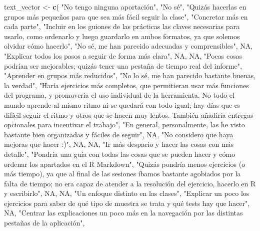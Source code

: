 \documentclass[
]{article}
\newenvironment{Shaded}{\begin{snugshade}}{\end{snugshade}}
\newcommand{\ConstantTok}[1]{\textcolor[rgb]{0.56,0.35,0.01}{#1}}
\newcommand{\FunctionTok}[1]{\textcolor[rgb]{0.13,0.29,0.53}{\textbf{#1}}}
\newcommand{\NormalTok}[1]{#1}
\newcommand{\OtherTok}[1]{\textcolor[rgb]{0.56,0.35,0.01}{#1}}
\newcommand{\StringTok}[1]{\textcolor[rgb]{0.31,0.60,0.02}{#1}}
\begin{document}
\begin{Shaded}
\begin{Highlighting}[]
\NormalTok{text\_vector }\OtherTok{\textless{}{-}} \FunctionTok{c}\NormalTok{(}
  \StringTok{"No tengo ninguna aportación"}\NormalTok{,}
  \StringTok{"No sé"}\NormalTok{,}
  \StringTok{"Quizás hacerlas en grupos más pequeños para que sea más fácil seguir la clase"}\NormalTok{,}
  \StringTok{"Concretar más en cada parte"}\NormalTok{,}
  \StringTok{"Incluir en los guiones de las prácticas las claves necesarias para usarlo, como ordenarlo y luego guardarlo en ambos formatos, ya que solemos olvidar cómo hacerlo"}\NormalTok{,}
  \StringTok{"No sé, me han parecido adecuadas y comprensibles"}\NormalTok{,}
  \ConstantTok{NA}\NormalTok{,}
  \StringTok{"Explicar todos los pasos a seguir de forma más clara"}\NormalTok{,}
  \ConstantTok{NA}\NormalTok{,}
  \ConstantTok{NA}\NormalTok{,}
  \StringTok{"Pocas cosas podrían ser mejorables; quizás tener una pestaña de tiempo real del informe"}\NormalTok{,}
  \StringTok{"Aprender en grupos más reducidos"}\NormalTok{,}
  \StringTok{"No lo sé, me han parecido bastante buenas, la verdad"}\NormalTok{,}
  \StringTok{"Haría ejercicios más completos, que permitieran usar más funciones del programa, y promovería el uso individual de la herramienta. No todo el mundo aprende al mismo ritmo ni se quedará con todo igual; hay días que es difícil seguir el ritmo y otros que se hacen muy lentos. También añadiría entregas opcionales para incentivar el trabajo"}\NormalTok{,}
  \StringTok{"En general, personalmente, las he visto bastante bien organizadas y fáciles de seguir"}\NormalTok{,}
  \ConstantTok{NA}\NormalTok{,}
  \StringTok{"No considero que haya mejoras que hacer :)"}\NormalTok{,}
  \ConstantTok{NA}\NormalTok{,}
  \ConstantTok{NA}\NormalTok{,}
  \StringTok{"Ir más despacio y hacer las cosas con más detalle"}\NormalTok{,}
  \StringTok{"Pondría una guía con todas las cosas que se pueden hacer y cómo ordenar los apartados en el R Markdown"}\NormalTok{,}
  \StringTok{"Quizás pondría menos ejercicios (o más tiempo), ya que al final de las sesiones íbamos bastante agobiados por la falta de tiempo; no era capaz de atender a la resolución del ejercicio, hacerlo en R y escribirlo"}\NormalTok{,}
  \ConstantTok{NA}\NormalTok{,}
  \ConstantTok{NA}\NormalTok{,}
  \StringTok{"Un enfoque distinto en las clases"}\NormalTok{,}
  \StringTok{"Explicar un poco los ejercicios para saber de qué tipo de muestra se trata y qué tests hay que hacer"}\NormalTok{,}
  \ConstantTok{NA}\NormalTok{,}
  \StringTok{"Centrar las explicaciones un poco más en la navegación por las distintas pestañas de la aplicación"}\NormalTok{,}

\end{Highlighting}
\end{Shaded}
\end{document}
